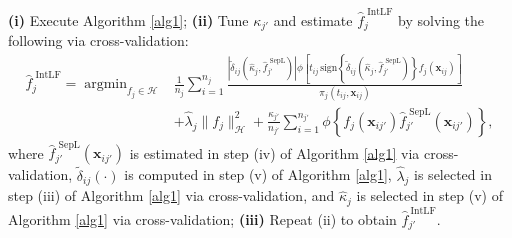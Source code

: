 \documentclass[12pt]{article}
\DeclareMathOperator*{\argmin}{argmin}
\begin{document}
\begin{algorithm}[]
\caption{IntLF Algorithm}\label{alg2}
\begin{algorithmic}
\State \textbf{(i)} Execute Algorithm \ref{alg1};
\State \textbf{(ii)} Tune $\kappa_{j'}$ and estimate $\widehat{f}_j^{\text{\ IntLF}}$ by solving the following via cross-validation:
    \begin{align*}
    \widehat{f}_j^{\text{\ IntLF}} = \argmin_{f_j \in \mathcal{H}} &\frac{1}{n_j} \sum_{i=1}^{n_j} \frac{\left|\widetilde{\delta}_{ij}\left(\widehat{\kappa}_j, \widehat{f}_{j'}^{\text{\ SepL}}\right)\right| \phi\left[t_{ij} \, \text{sign}\left\{\widetilde{\delta}_{ij}\left(\widehat{\kappa}_j, \widehat{f}_{j'}^{\text{\ SepL}}\right)\right\} f_j(\boldsymbol{x}_{ij})\right]}{\pi_j(t_{ij}, \boldsymbol{x}_{ij})} \\
    & + \widehat{\lambda}_j \|f_j\|_{\mathcal{H}}^2 + \frac{\kappa_{j'}}{n_{j'}}\sum^{n_{j'}}_{i=1}\phi\left\{f_j(\boldsymbol x_{ij'})\widehat{f}_{j'}^{\text{\ SepL}}(\boldsymbol x_{ij'})\right\},    
    \end{align*}
    where $\widehat{f}_{j'}^{\text{\ SepL}}(\boldsymbol x_{ij'})$ is estimated in step (iv) of Algorithm \ref{alg1} via cross-validation, $\widetilde{\delta}_{ij}\left(\cdot\right)$ is computed in step (v) of Algorithm \ref{alg1}, $\widehat{\lambda}_j$ is selected in step (iii) of Algorithm \ref{alg1} via cross-validation, and $\widehat{\kappa}_j$ is selected in step (v) of Algorithm \ref{alg1} via cross-validation;
\State \textbf{(iii)} Repeat (ii) to obtain $\widehat{f}_{j'}^{\ \text{IntLF}}$.
\end{algorithmic}
\end{algorithm}
\end{document}
